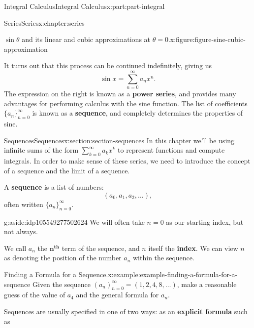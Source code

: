 \documentclass[twoside,10pt,]{book}
\newcommand{\terminology}[1]{\textbf{#1}}
\numberwithin{equation}{part}
\begin{document}
\begin{partptx}{Integral Calculus}{}{Integral Calculus}{}{}{x:part:part-integral}
\begin{chapterptx}{Series}{}{Series}{}{}{x:chapter:series}
\begin{introduction}{}
\begin{figureptx}{\(\sin\theta\) and its linear and cubic approximations at \(\theta=0\).}{x:figure:figure-sine-cubic-approximation}{}
\begin{image}{0}{1}{0}
{
}%
\end{image}%
\tcblower
\end{figureptx}%
It turns out that this process can be continued indefinitely, giving us%
\begin{equation*}
\sin x = \sum_{n=0}^{\infty}a_{n}x^{n}.
\end{equation*}
The expression on the right is known as a \terminology{power series}, and provides many advantages for performing calculus with the sine function. The list of coefficients \(\{a_{n}\}_{n=0}^{\infty}\) is known as a \terminology{sequence}, and completely determines the properties of sine.%
\end{introduction}%
%
%
\typeout{************************************************}
\typeout{************************************************}
%
\begin{sectionptx}{Sequences}{}{Sequences}{}{}{x:section:section-sequences}
In this chapter we'll be using infinite sums of the form \(\sum_{k=0}^{\infty}a_k x^k\) to represent functions and compute integrals. In order to make sense of these series, we need to introduce the concept of a sequence and the limit of a sequence.%
\par
A \terminology{sequence} is a list of numbers:%
\begin{equation*}
(a_{0}, a_{1}, a_{2}, \ldots),
\end{equation*}
often written \(\{a_{n}\}_{n=0}^{\infty}\). \begin{aside}{}{g:aside:idp105549277502624}%
We will often take \(n = 0\) as our starting index, but not always.%
\end{aside}
 We call \(a_{n}\) the \(\mathbf{n}^{\textbf{th}}\) term of the sequence, and \(n\) itself the \terminology{index}. We can view \(n\) as denoting the position of the number \(a_n\) within the sequence.%
\begin{example}{Finding a Formula for a Sequence.}{x:example:example-finding-a-formula-for-a-sequence}%
Given the sequence \((a_n)_{n=0}^{\infty} = (1, 2, 4, 8, \ldots)\), make a reasonable guess of the value of \(a_4\) and the general formula for \(a_n\).%
\end{example}
Sequences are usually specified in one of two ways: as an \terminology{explicit formula} such as%
\begin{equation*}

\end{equation*}
\end{sectionptx}
\end{chapterptx}
\end{partptx}
\end{document}
